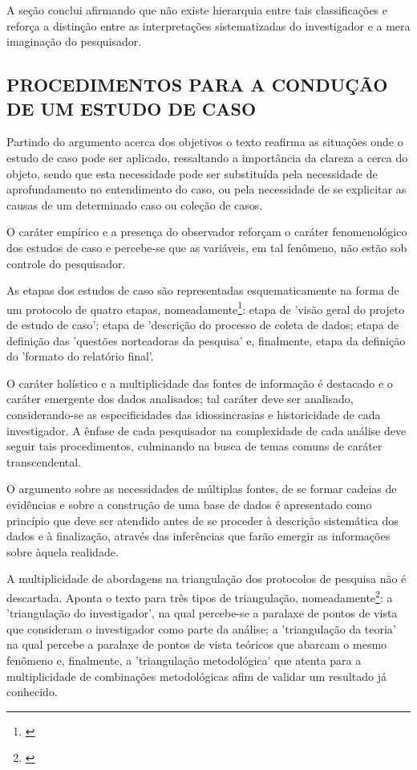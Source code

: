 \documentclass[
   article,       %
   12pt,          %
   oneside,       %
   a4paper,       %
   english,       %
   brazil,           %
   sumario=tradicional
   ]{abntex2}
\begin{document}
A seção conclui afirmando que não existe hierarquia entre tais classificações e reforça a distinção entre as interpretações sistematizadas do investigador e a mera imaginação do pesquisador.


\subsection{PROCEDIMENTOS PARA A CONDUÇÃO DE UM ESTUDO DE CASO}

Partindo do argumento acerca dos objetivos o texto reafirma as situações onde o estudo de caso pode ser aplicado, ressaltando a importância da clareza a cerca do objeto, sendo que esta necessidade pode ser substituída pela necessidade de aprofundamento no entendimento do caso, ou pela necessidade de se explicitar as causas de um determinado caso ou coleção de casos.

O caráter empírico e a presença do observador reforçam o caráter fenomenológico dos estudos de caso e percebe-se que as variáveis, em tal fenômeno, não estão sob controle do pesquisador.

As etapas dos estudos de caso são representadas esquematicamente na forma de um protocolo de quatro etapas, nomeadamente\footnote{\cite[p.179]{cap_6_ontologia}}: etapa de 'visão geral do projeto de estudo de caso'; etapa de 'descrição do processo de coleta de dados; etapa de definição das 'questões norteadoras da pesquisa' e, finalmente, etapa da definição do 'formato do relatório final'.

O caráter holístico e a multiplicidade das fontes de informação é destacado e o caráter emergente dos dados analisados; tal caráter deve ser analisado, considerando-se as especificidades das idiossincrasias e historicidade de cada investigador. A ênfase de cada pesquisador na complexidade de cada análise deve seguir tais procedimentos, culminando na busca de temas comuns de caráter transcendental.

O argumento sobre as necessidades de múltiplas fontes, de se formar cadeias de evidências e sobre a construção de uma base de dados é apresentado como princípio que deve ser atendido antes de se proceder à descrição sistemática dos dados e à finalização, através das inferências que farão emergir as informações sobre àquela realidade.

A multiplicidade de abordagens na triangulação dos protocolos de pesquisa não é descartada. Aponta o texto para três tipos de triangulação, nomeadamente\footnote{\cite[p.180]{cap_6_ontologia}}: a 'triangulação do investigador', na qual percebe-se a paralaxe de pontos de vista que consideram o investigador como parte da análise; a 'triangulação da teoria' na qual percebe a paralaxe de pontos de vista teóricos que abarcam o mesmo fenômeno e, finalmente, a 'triangulação metodológica' que atenta para a multiplicidade de combinações metodológicas afim de validar um resultado já conhecido.
\end{document}
